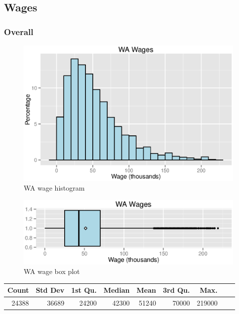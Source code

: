 \documentclass{exam}
\begin{document}
  \subsection{Wages}

  \subsubsection{Overall}
  \begin{figure}[H]
    \centering
    \includegraphics[scale = 0.8]{figures/wa_wage_histogram.eps}
    \caption{WA wage histogram}
  \end{figure}

  \begin{figure}[H]
    \centering
    \includegraphics{figures/wa_wage.eps}
    \caption{WA wage box plot}
  \end{figure}

  \begin{table}[ht]
    \centering
    \begin{tabular}{rrrrrrrrr}
      \toprule
        Count & Std Dev & 1st Qu. & Median & Mean  & 3rd Qu. & Max. \\
      \midrule
        24388 & 36689   & 24200   & 42300  & 51240 & 70000   & 219000 \\
      \bottomrule
    \end{tabular}
  \end{table}
\end{document}
